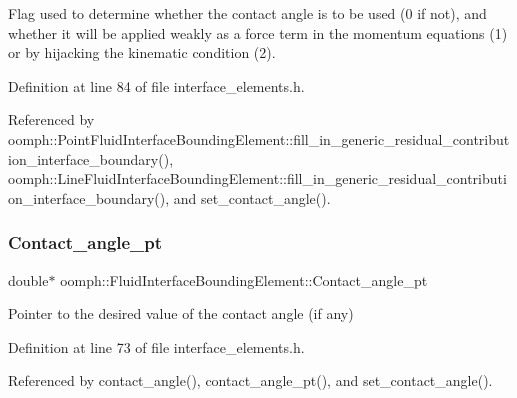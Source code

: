 Flag used to determine whether the contact angle is to be used (0 if not), and whether it will be applied weakly as a force term in the momentum equations (1) or by hijacking the kinematic condition (2). 



Definition at line 84 of file interface\+\_\+elements.\+h.



Referenced by oomph\+::\+Point\+Fluid\+Interface\+Bounding\+Element\+::fill\+\_\+in\+\_\+generic\+\_\+residual\+\_\+contribution\+\_\+interface\+\_\+boundary(), oomph\+::\+Line\+Fluid\+Interface\+Bounding\+Element\+::fill\+\_\+in\+\_\+generic\+\_\+residual\+\_\+contribution\+\_\+interface\+\_\+boundary(), and set\+\_\+contact\+\_\+angle().

\mbox{\label{classoomph_1_1FluidInterfaceBoundingElement_a351532c356c9e839cba87150bea354c5}} 
\subsubsection{\texorpdfstring{Contact\+\_\+angle\+\_\+pt}{Contact\_angle\_pt}}
{\footnotesize\ttfamily double$\ast$ oomph\+::\+Fluid\+Interface\+Bounding\+Element\+::\+Contact\+\_\+angle\+\_\+pt\hspace{0.3cm}{\ttfamily [private]}}



Pointer to the desired value of the contact angle (if any) 



Definition at line 73 of file interface\+\_\+elements.\+h.



Referenced by contact\+\_\+angle(), contact\+\_\+angle\+\_\+pt(), and set\+\_\+contact\+\_\+angle().

\mbox{\label{classoomph_1_1FluidInterfaceBoundingElement_a08223fefc36922f4661e30e9de16830f}} 
